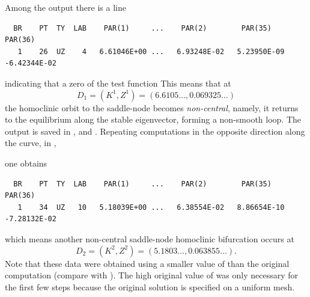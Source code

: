 \documentclass[12pt]{report}
\begin{document}
Among the output there is a line 
\begin{verbatim}
  BR    PT  TY  LAB    PAR(1)     ...    PAR(2)        PAR(35)       PAR(36)
   1    26  UZ    4   6.61046E+00 ...   6.93248E-02   5.23950E-09  -6.42344E-02
\end{verbatim}
indicating that a zero of the test function  
This means that at
$$
D_1=(K^1,Z^1)=(6.6105\ldots, 0.069325\ldots)
$$
the homoclinic orbit to the saddle-node becomes {\it non-central}, namely,
it returns to the equilibrium along the stable eigenvector, forming a
non-smooth loop. The output is saved in ,  and
. 
Repeating computations in the opposite direction along the curve, 
 in , 
\begin{center}
\end{center}
one obtains 
\begin{verbatim}
  BR    PT  TY  LAB    PAR(1)     ...    PAR(2)        PAR(35)       PAR(36)
   1    34  UZ   10   5.18039E+00 ...   6.38554E-02   8.86654E-10  -7.28132E-02
\end{verbatim}
which means another non-central saddle-node homoclinic bifurcation occurs
at
$$
D_2=(K^2,Z^2)=(5.1803\ldots,0.063855\ldots).
$$
Note that these data were obtained using a smaller value of  than
the original computation (compare  with ). The
high original value of  was only necessary for the first few steps
because the original solution is specified on a uniform mesh. 
\end{document}

